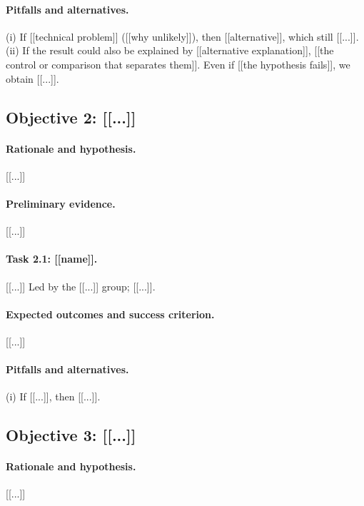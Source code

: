 \documentclass[12pt,a4paper]{article}
\begin{document}
\paragraph{Pitfalls and alternatives.} (i) If [[technical problem]] ([[why unlikely]]), then
[[alternative]], which still [[...]]. (ii) If the result could also be explained by
[[alternative explanation]], [[the control or comparison that separates them]]. Even if
[[the hypothesis fails]], we obtain [[...]].

\subsection{Objective 2: [[...]]}
\paragraph{Rationale and hypothesis.} [[...]]
\paragraph{Preliminary evidence.} [[...]]
\paragraph{Task 2.1: [[name]].} [[...]] Led by the [[...]] group; [[...]].
\paragraph{Expected outcomes and success criterion.} [[...]]
\paragraph{Pitfalls and alternatives.} (i) If [[...]], then [[...]].

\subsection{Objective 3: [[...]]}
\paragraph{Rationale and hypothesis.} [[...]]
\end{document}
